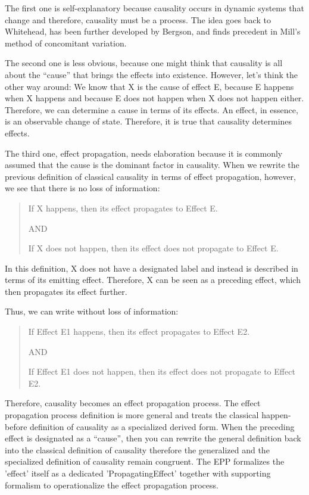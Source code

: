 The first one is self-explanatory because causality occurs in dynamic systems that change and therefore, causality must be a process. The idea goes back to Whitehead, has been further developed by Bergson, and finds precedent in Mill's method of concomitant variation\cite{mill2023system}.  

The second one is less obvious, because one might think that causality is all about the “cause” that brings the effects into existence. However, let’s think the other way around: We know that X is the cause of effect E, because E happens when X happens and because E does not happen when X does not happen either. Therefore, we can determine a cause in terms of its effects. An effect, in essence, is an observable change of state. Therefore, it is true that causality determines effects.

The third one, effect propagation, needs elaboration because it is commonly assumed that the cause is the dominant factor in causality. When we rewrite the previous definition of classical causality in terms of effect propagation, however, we see that there is no loss of information:

\begin{quote}
    If X happens, then its effect propagates to Effect E.

    AND
    
    If X does not happen, then its effect does not propagate to Effect E.
\end{quote}

In this definition, X does not have a designated label and instead is described in terms of its emitting effect. Therefore, X can be seen as a preceding effect, which then propagates its effect further. 

\newpage

Thus, we can write without loss of information:


\begin{quote}
	If Effect E1 happens, then its effect propagates to Effect E2.

    AND
    
	If Effect E1 does not happen, then its effect does not propagate to Effect E2.
\end{quote}

Therefore, causality becomes an effect propagation process. The effect propagation process definition is more general and treats the classical happen-before definition of causality as a specialized derived form. When the preceding effect is designated as a “cause”, then you can rewrite the general definition back into the classical definition of causality therefore the generalized and the specialized definition of causality remain congruent. The EPP formalizes the 'effect' itself as a dedicated 'PropagatingEffect' together with supporting formalism to operationalize the effect propagation process.


